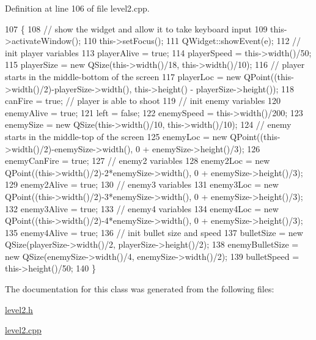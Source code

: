 Definition at line 106 of file level2.\+cpp.


\begin{DoxyCode}
107 \{
108     \textcolor{comment}{// show the widget and allow it to take keyboard input}
109     this->activateWindow();
110     this->setFocus();
111     QWidget::showEvent(e);
112     \textcolor{comment}{// init player variables}
113     playerAlive = \textcolor{keyword}{true};
114     playerSpeed = this->width()/50;
115     playerSize = \textcolor{keyword}{new} QSize(this->width()/18, this->width()/10);
116     \textcolor{comment}{// player starts in the middle-bottom of the screen}
117     playerLoc = \textcolor{keyword}{new} QPoint((this->width()/2)-playerSize->width(), this->height() - playerSize->height());
118     canFire = \textcolor{keyword}{true}; \textcolor{comment}{// player is able to shoot}
119     \textcolor{comment}{// init enemy variables}
120     enemyAlive = \textcolor{keyword}{true};
121     left = \textcolor{keyword}{false};
122     enemySpeed = this->width()/200;
123     enemySize = \textcolor{keyword}{new} QSize(this->width()/10, this->width()/10);
124     \textcolor{comment}{// enemy starts in the middle-top of the screen}
125     enemyLoc = \textcolor{keyword}{new} QPoint((this->width()/2)-enemySize->width(), 0 + enemySize->height()/3);
126     enemyCanFire = \textcolor{keyword}{true};
127     \textcolor{comment}{// enemy2 variables}
128     enemy2Loc = \textcolor{keyword}{new} QPoint((this->width()/2)-2*enemySize->width(), 0 + enemySize->height()/3);
129     enemy2Alive = \textcolor{keyword}{true};
130     \textcolor{comment}{// enemy3 variables}
131     enemy3Loc = \textcolor{keyword}{new} QPoint((this->width()/2)-3*enemySize->width(), 0 + enemySize->height()/3);
132     enemy3Alive = \textcolor{keyword}{true};
133     \textcolor{comment}{// enemy4 variables}
134     enemy4Loc = \textcolor{keyword}{new} QPoint((this->width()/2)-4*enemySize->width(), 0 + enemySize->height()/3);
135     enemy4Alive = \textcolor{keyword}{true};
136     \textcolor{comment}{// init bullet size and speed}
137     bulletSize = \textcolor{keyword}{new} QSize(playerSize->width()/2, playerSize->height()/2);
138     enemyBulletSize = \textcolor{keyword}{new} QSize(enemySize->width()/4, enemySize->width()/2);
139     bulletSpeed = this->height()/50;
140 \}
\end{DoxyCode}


The documentation for this class was generated from the following files\+:\begin{DoxyCompactItemize}
\item 
\hyperlink{level2_8h}{level2.\+h}\item 
\hyperlink{level2_8cpp}{level2.\+cpp}\end{DoxyCompactItemize}
